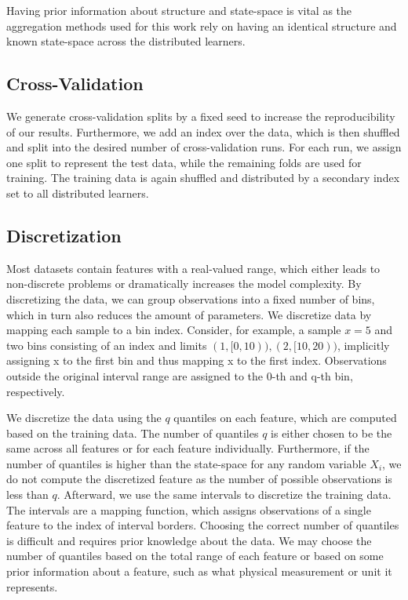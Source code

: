 Having prior information about structure and state-space is vital as the aggregation methods used for this work rely on having an identical structure and known state-space across the distributed learners.

\subsection{Cross-Validation}
We generate cross-validation splits by a fixed seed to increase the reproducibility of our results.
Furthermore, we add an index over the data, which is then shuffled and split into the desired number of cross-validation runs.
For each run, we assign one split to represent the test data, while the remaining folds are used for training.
The training data is again shuffled and distributed by a secondary index set to all distributed learners.

\subsection{Discretization}
Most datasets contain features with a real-valued range, which either leads to non-discrete problems or dramatically increases the model complexity.
By discretizing the data, we can group observations into a fixed number of bins, which in turn also reduces the amount of parameters.
We discretize data by mapping each sample to a bin index.
Consider, for example, a sample $x=5$ and two bins consisting of an index and limits $(1,[0,10)),(2,[10,20))$, implicitly assigning x to the first bin and thus mapping x to the first index. 
Observations outside the original interval range are assigned to the 0-th and q-th bin, respectively.

We discretize the data using the $q$ quantiles on each feature, which are computed based on the training data. 
The number of quantiles $q$ is either chosen to be the same across all features or for each feature individually.
Furthermore, if the number of quantiles is higher than the state-space for any random variable $X_i$, we do not compute the discretized feature as the number of possible observations is less than $q$.
Afterward, we use the same intervals to discretize the training data.
The intervals are a mapping function, which assigns observations of a single feature to the index of interval borders. 
Choosing the correct number of quantiles is difficult and requires prior knowledge about the data.
We may choose the number of quantiles based on the total range of each feature or based on some prior information about a feature, such as what physical measurement or unit it represents.

